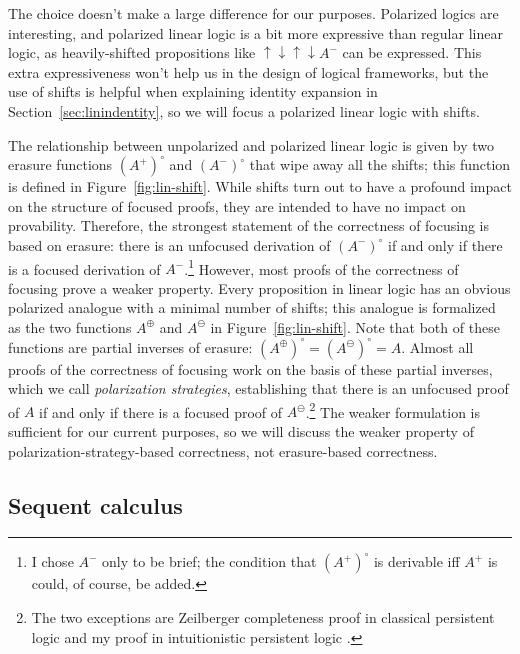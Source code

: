 The choice doesn't make a large difference for our purposes.
Polarized logics are interesting, and polarized linear logic is a bit
more expressive than regular linear logic, as heavily-shifted
propositions like ${\uparrow}{\downarrow}{\uparrow}{\downarrow}A^-$
can be expressed. This extra expressiveness won't help us in
the design of logical frameworks, but the use of shifts is helpful
when explaining identity expansion in Section~\ref{sec:linindentity}, 
so we will focus a polarized linear logic with shifts.



The relationship between unpolarized and polarized linear logic is
given by two erasure functions $(A^+)^\circ$ and $(A^-)^\circ$ that
wipe away all the shifts; this function is defined in
Figure~\ref{fig:lin-shift}. While shifts turn out to have a profound
impact on the structure of focused proofs, they are intended to have
no impact on provability. Therefore, the strongest statement of the
correctness of focusing is based on erasure: there is an unfocused
derivation of $(A^-)^\circ$ if and only if there is a focused
derivation of $A^-$.\footnote{I chose $A^-$ only to be brief; the
  condition that $(A^+)^\circ$ is derivable iff $A^+$ is could, of
  course, be added.}  However, most proofs of the correctness of
focusing prove a weaker property. Every proposition in linear logic
has an obvious polarized analogue with a minimal number of shifts;
this analogue is formalized as the two functions $A^\oplus$ and
$A^\ominus$ in Figure~\ref{fig:lin-shift}. Note that both of these
functions are partial inverses of erasure: $(A^\oplus)^\circ =
(A^\ominus)^\circ = A$. Almost all proofs of the correctness of
focusing work on the basis of these partial inverses, which we call
{\it polarization strategies}, establishing that there is an unfocused
proof of $A$ if and only if there is a focused proof of
$A^\ominus$.\footnote{The two exceptions are Zeilberger completeness
  proof in classical persistent logic \cite{zeilberger08unity} and my
  proof in intuitionistic persistent logic \cite{simmons11structural}.}
The weaker formulation is sufficient for our current purposes, so we
will discuss the weaker property of polarization-strategy-based
correctness, not erasure-based correctness.

\subsection{Sequent calculus}

